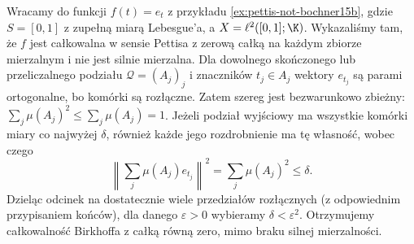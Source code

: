 \begin{przyklad}
\label{ex:birkhoff-not-strong15b}
Wracamy do funkcji $f(t)=e_t$ z przykładu
\ref{ex:pettis-not-bochner15b}, gdzie $S=[0,1]$
z zupełną miarą Lebesgue'a, a $X=\ell^2([0,1];\K)$.
Wykazaliśmy tam, że $f$ jest całkowalna w sensie
Pettisa z zerową całką na każdym zbiorze mierzalnym
i nie jest silnie mierzalna.
Dla dowolnego skończonego lub przeliczalnego podziału
$\mathcal Q=(A_j)_j$ i znaczników $t_j\in A_j$
wektory $e_{t_j}$ są parami ortogonalne, bo komórki
są rozłączne. Zatem szereg jest bezwarunkowo zbieżny:
$\sum_j\mu(A_j)^2\le\sum_j\mu(A_j)=1$.
Jeżeli podział wyjściowy ma wszystkie komórki
miary co najwyżej $\delta$, również każde jego
rozdrobnienie ma tę własność, wobec czego
\[
 \left\|\sum_j\mu(A_j)e_{t_j}\right\|^2
 =\sum_j\mu(A_j)^2\le\delta.
\]
Dzieląc odcinek na dostatecznie wiele przedziałów
rozłącznych (z odpowiednim przypisaniem końców),
dla danego $\varepsilon>0$ wybieramy $\delta<\varepsilon^2$.
Otrzymujemy całkowalność Birkhoffa z całką równą zero,
mimo braku silnej mierzalności.
\end{przyklad}

